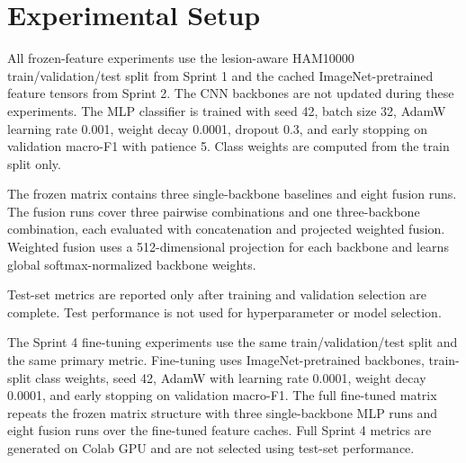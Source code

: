 \section{Experimental Setup}

All frozen-feature experiments use the lesion-aware HAM10000 train/validation/test split from Sprint 1 and the cached ImageNet-pretrained feature tensors from Sprint 2. The CNN backbones are not updated during these experiments. The MLP classifier is trained with seed 42, batch size 32, AdamW learning rate 0.001, weight decay 0.0001, dropout 0.3, and early stopping on validation macro-F1 with patience 5. Class weights are computed from the train split only.

The frozen matrix contains three single-backbone baselines and eight fusion runs. The fusion runs cover three pairwise combinations and one three-backbone combination, each evaluated with concatenation and projected weighted fusion. Weighted fusion uses a 512-dimensional projection for each backbone and learns global softmax-normalized backbone weights.

Test-set metrics are reported only after training and validation selection are complete. Test performance is not used for hyperparameter or model selection.

The Sprint 4 fine-tuning experiments use the same train/validation/test split and the same primary
metric. Fine-tuning uses ImageNet-pretrained backbones, train-split class weights, seed 42, AdamW
with learning rate 0.0001, weight decay 0.0001, and early stopping on validation macro-F1. The full
fine-tuned matrix repeats the frozen matrix structure with three single-backbone MLP runs and eight
fusion runs over the fine-tuned feature caches. Full Sprint 4 metrics are generated on Colab GPU and
are not selected using test-set performance.
